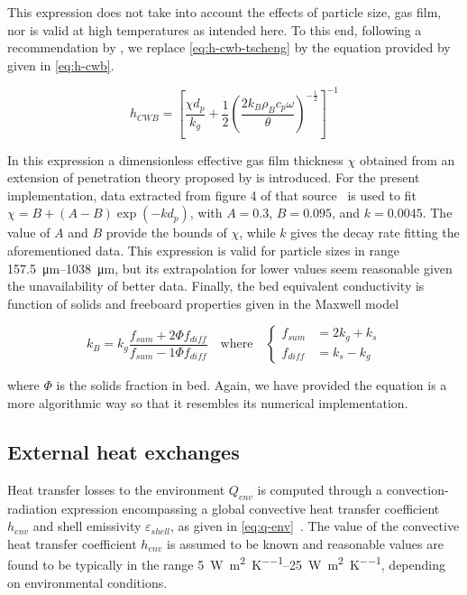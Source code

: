 \documentclass[11pt]{paper}
\begin{document}
This expression does not take into account the effects of particle size, gas film, nor is valid at high temperatures as intended here. To this end, following a recommendation by \textcite{Hanein2017}, we replace \eqref{eq:h-cwb-tscheng} by the equation provided by \textcite{Li2005} given in \eqref{eq:h-cwb}.

\begin{equation}
h _{CWB}=\left[
\frac{\chi{}d_{p}}{k_{g}}+
\frac{1}{2}\left(\frac{2k_{B}\rho_{B}c_{p}\omega}{\theta}\right)^{-\frac{1}{2}}
\right]^{-1}
\label{eq:h-cwb}
\end{equation}

In this expression a dimensionless effective gas film thickness $\chi$ obtained from an extension of penetration theory proposed by \textcite{Li2005} is introduced. For the present implementation, data extracted from figure 4 of that source~\cite{Li2005} is used to fit $\chi=B+(A-B)\exp(-kd_{p})$, with $A=0.3$, $B=0.095$, and $k=0.0045$. The value of $A$ and $B$ provide the bounds of $\chi$, while $k$ gives the decay rate fitting the aforementioned data. This expression is valid for particle sizes in range \SIrange{157.5}{1038}{\micro\meter}, but its extrapolation for lower values seem reasonable given the unavailability of better data. Finally, the bed equivalent conductivity is function of solids and freeboard properties given in the Maxwell model

\begin{equation}
k_{B}=k_{g}\frac{f_{sum}+2\Phi{}f_{diff}}{f_{sum}-1\Phi{}f_{diff}}
\quad\text{where}\quad
\begin{cases}
    f_{sum}  &= 2k_{g}+k_{s}\\[8pt]
    f_{diff} &= k_{s}-k_{g}
\end{cases}
\end{equation}

\noindent{}where $\Phi$ is the solids fraction in bed. Again, we have provided the equation is a more algorithmic way so that it resembles its numerical implementation.

\subsection{External heat exchanges}

Heat transfer losses to the environment $Q_{env}$ is computed through a convection-radiation expression encompassing a global convective heat transfer coefficient $h_{env}$ and shell emissivity $\varepsilon_{shell}$, as given in \eqref{eq:q-env}~\cite{Mujumdar2006i,Mujumdar2006ii}. The value of the convective heat transfer coefficient $h_{env}$ is assumed to be known and reasonable values are found to be typically in the range \SIrange{5}{25}{\watt\per\square\meter\per\kelvin}, depending on environmental conditions.
\end{document}
